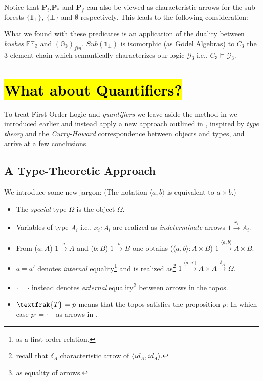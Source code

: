 Notice that $\textbf{P}_t$,$\textbf{P}_*$ and $\textbf{P}_f$ can also be viewed as characteristic arrows for the sub-forests $\{\textbf{1}_\bot\}$, $\{\bot\}$ and $\emptyset$ respectively.
\newline
This leads to the following consideration:
\begin{remark}
	What we found with these predicates is an application of the duality between \emph{bushes} $\mathbb{FF_2}$ and $(\mathbb{G_3})_{fin}$. \newline
	 $Sub(\textbf{1}_\bot)$ is isomorphic (as Gödel Algebras) to $C_3$ the 3-element chain which semantically characterizes our logic $\mathcal{G}_3$ i.e., $C_3 \models \mathcal{G}_3$.
\end{remark}


\newpage

\section{\hl{What about Quantifiers?}}
\label{whataboutquant}
To treat First Order Logic and \emph{quantifiers} we leave aside the method in \cite{goldblatt} we introduced earlier and instead apply a new approach outlined in \cite{lambekscott}, inspired by \emph{type theory} and the \emph{Curry-Howard} correspondence between objects and types, and arrive at a few conclusions.

\subsection{A Type-Theoretic Approach}

We introduce some new jargon:\newline
(The notation $\langle a,b \rangle$ is equivalent to $a \times b$.)	

\begin{itemize}
	\item The \emph{special} type $\Omega$ is the object $\Omega$.
	\item Variables of type $A_i$  i.e., $x_i:A_i$ are realized as \emph{indeterminate} arrows $1 \xrightarrow{x_i} A_i.$ 
	\item From  ($a:A$) $1 \xrightarrow{a} A$  and ($b:B$) $1 \xrightarrow{b} B$  one obtains  
	($\langle a,b \rangle : A \times B$)  $1 \xrightarrow{\langle a,b \rangle} A \times B$.
	\item $a=a'$ denotes \emph{internal} equality\footnote{as a first order relation.} and is realized as\footnote{recall that $\delta_A$  characteristic arrow of $\langle id_{A},id_{A} \rangle$.} 
	$1\xrightarrow{\langle a,a' \rangle}A \times A \xrightarrow{\delta_A}\Omega$.
	\item $\cdot = \cdot$ instead denotes \emph{external} equality\footnote{as equality of arrows.} between arrows in the topos.
	\item $\textfrak{T} \models p$ means that the topos  satisfies the proposition $p$: In which case $p \cdot = \cdot \top$ as arrows in .	 
\end{itemize}
	
